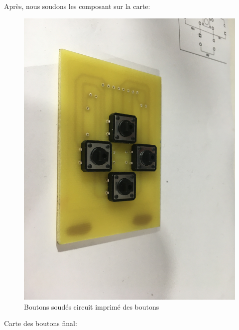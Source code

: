 \FloatBarrier

Après, nous soudons les composant sur la carte:

\begin{figure}[!htbp]
    \centering
    \includegraphics[width=.6\textwidth]{assets/realisation/cartes/2022-03-25 15.17.03.jpeg}
    \caption{Boutons soudés circuit imprimé des boutons}
\end{figure}

\FloatBarrier

Carte des boutons final:

